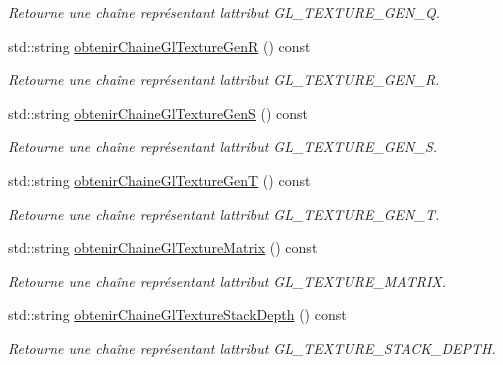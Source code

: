 \begin{DoxyCompactItemize}
\begin{DoxyCompactList}\small\item\em Retourne une chaîne représentant l\textquotesingle{}attribut G\+L\+\_\+\+T\+E\+X\+T\+U\+R\+E\+\_\+\+G\+E\+N\+\_\+\+Q. \end{DoxyCompactList}\item 
std\+::string \hyperlink{group__utilitaire_ga232ca6071605477892ccd38781f48b53}{obtenir\+Chaine\+Gl\+Texture\+Gen\+R} () const 
\begin{DoxyCompactList}\small\item\em Retourne une chaîne représentant l\textquotesingle{}attribut G\+L\+\_\+\+T\+E\+X\+T\+U\+R\+E\+\_\+\+G\+E\+N\+\_\+\+R. \end{DoxyCompactList}\item 
std\+::string \hyperlink{group__utilitaire_gac92ef30b356fe2de552d88b455aa0b20}{obtenir\+Chaine\+Gl\+Texture\+Gen\+S} () const 
\begin{DoxyCompactList}\small\item\em Retourne une chaîne représentant l\textquotesingle{}attribut G\+L\+\_\+\+T\+E\+X\+T\+U\+R\+E\+\_\+\+G\+E\+N\+\_\+\+S. \end{DoxyCompactList}\item 
std\+::string \hyperlink{group__utilitaire_gaa225300590e106cd32d3a011d1ff6599}{obtenir\+Chaine\+Gl\+Texture\+Gen\+T} () const 
\begin{DoxyCompactList}\small\item\em Retourne une chaîne représentant l\textquotesingle{}attribut G\+L\+\_\+\+T\+E\+X\+T\+U\+R\+E\+\_\+\+G\+E\+N\+\_\+\+T. \end{DoxyCompactList}\item 
std\+::string \hyperlink{group__utilitaire_gad21a2e048b745fe84c5befbd361f2f5e}{obtenir\+Chaine\+Gl\+Texture\+Matrix} () const 
\begin{DoxyCompactList}\small\item\em Retourne une chaîne représentant l\textquotesingle{}attribut G\+L\+\_\+\+T\+E\+X\+T\+U\+R\+E\+\_\+\+M\+A\+T\+R\+I\+X. \end{DoxyCompactList}\item 
std\+::string \hyperlink{group__utilitaire_ga278f05112b89edd0cbb3d601d73fadb4}{obtenir\+Chaine\+Gl\+Texture\+Stack\+Depth} () const 
\begin{DoxyCompactList}\small\item\em Retourne une chaîne représentant l\textquotesingle{}attribut G\+L\+\_\+\+T\+E\+X\+T\+U\+R\+E\+\_\+\+S\+T\+A\+C\+K\+\_\+\+D\+E\+P\+T\+H. \end{DoxyCompactList}\item 

\end{DoxyCompactItemize}

